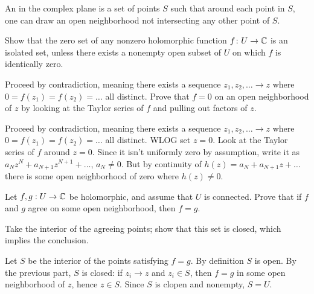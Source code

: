 \begin{sproblem}
	An  in the complex plane is a
	set of points $S$ such that around each point in $S$,
	one can draw an open neighborhood not intersecting any other point of $S$.

	Show that the zero set of any nonzero holomorphic
	function $f \colon U \to \mathbb C$ is an isolated set,
	unless there exists a nonempty open subset of $U$
	on which $f$ is identically zero.
	\begin{hint}
		Proceed by contradiction,
		meaning there exists a sequence $z_1, z_2, \dots \to z$
		where $0 = f(z_1) = f(z_2) = \dots$ all distinct.
		Prove that $f = 0$ on an open neighborhood of $z$
		by looking at the Taylor series of $f$ and
		pulling out factors of $z$.
	\end{hint}
	\begin{sol}
		Proceed by contradiction, meaning there exists a sequence $z_1, z_2, \dots \to z$
		where $0 = f(z_1) = f(z_2) = \dots$ all distinct.
		WLOG set $z=0$.
		Look at the Taylor series of $f$ around $z=0$.
		Since it isn't uniformly zero by assumption,
		write it as $a_N z^N + a_{N+1}z^{N+1} + \dots$, $a_N \neq 0$.
		But by continuity of $h(z) = a_N + a_{N+1}z + \dots$ there is some
		open neighborhood of zero where $h(z) \neq 0$.
	\end{sol}
\end{sproblem}

\begin{sproblem}
	\gim
	Let $f, g : U \to \mathbb C$ be holomorphic, and assume that $U$ is connected.
	Prove that if $f$ and $g$ agree on some open neighborhood,
	then $f = g$.
	\begin{hint}
		Take the interior of the agreeing points;
		show that this set is closed, which implies the conclusion.
	\end{hint}
	\begin{sol}
		Let $S$ be the interior of the points satisfying $f=g$.
		By definition $S$ is open.
		By the previous part, $S$ is closed: if $z_i \to z$ and $z_i \in S$,
		then $f=g$ in some open neighborhood of $z$, hence $z \in S$.
		Since $S$ is clopen and nonempty, $S = U$.
	\end{sol}
\end{sproblem}


